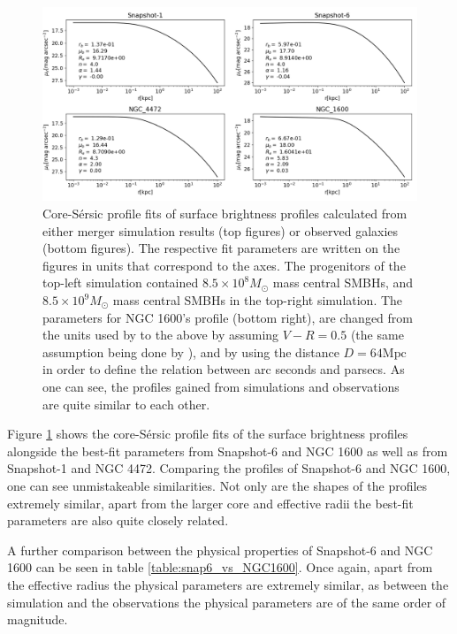 \documentclass[english, oneside]{HYgradu}
\begin{document}
\begin{figure}[h]
	\centering
	\includegraphics[width=\textwidth]{core_sersic_fits_obs_and_sim.png}
	\caption{Core-Sérsic profile fits of surface brightness profiles calculated from either merger simulation results (top figures) or observed galaxies (bottom figures). The respective fit parameters are written on the figures in units that correspond to the axes. The progenitors of the top-left simulation contained $8.5 \times 10^8 M_\odot$ mass central SMBHs, and $8.5 \times 10^9 M_\odot$ mass central SMBHs in the top-right simulation. The parameters for NGC 1600's profile (bottom right), are changed from the units used by \cite{Thomas2016} to the above by assuming $V - R = 0.5$ (the same assumption being done by \cite{Lauer2007}), and by using the distance $D = 64 \mathrm{Mpc}$ \citep{Thomas2016} in order to define the relation between arc seconds and parsecs. As one can see, the profiles gained from simulations and observations are quite similar to each other.}
	\label{figure:coresersic_sim_obs}
\end{figure}

Figure \ref{figure:coresersic_sim_obs} shows the core-Sérsic profile fits of the surface brightness profiles alongside the best-fit parameters from Snapshot-6 and NGC 1600 as well as from Snapshot-1 and NGC 4472. Comparing the profiles of Snapshot-6 and NGC 1600, one can see unmistakeable similarities. Not only are the shapes of the profiles extremely similar, apart from the larger core and effective radii the best-fit parameters are also quite closely related.

A further comparison between the physical properties of Snapshot-6 and NGC 1600 can be seen in table \ref{table:snap6_vs_NGC1600}. Once again, apart from the effective radius the physical parameters are extremely similar, as between the simulation and the observations the physical parameters are of the same order of magnitude.
\end{document}
